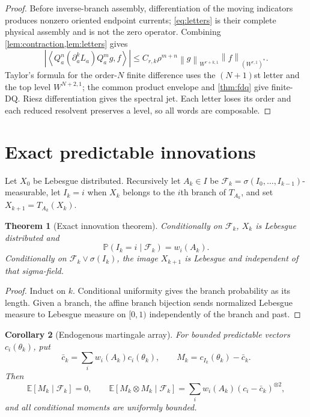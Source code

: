 \documentclass[11pt,reqno]{amsart}
\newtheorem{theorem}{Theorem}[section]
\newtheorem{corollary}[theorem]{Corollary}
\theoremstyle{definition}
\theoremstyle{remark}
\newcommand{\F}{\mathcal F}
\newcommand{\Pp}{\mathbb P}
\newcommand{\norm}[1]{\left\lVert #1\right\rVert}
\newcommand{\abs}[1]{\left\lvert #1\right\rvert}
\newcommand{\pair}[2]{\left\langle #1,#2\right\rangle}
\begin{document}
\begin{proof}
Before inverse-branch assembly, differentiation of the moving indicators
produces nonzero oriented endpoint currents; \eqref{eq:letters} is their
complete physical assembly and is not the zero operator.  Combining
\cref{lem:contraction,lem:letters} gives
\[
 \abs{\pair{Q_a^n(\partial_a^kL_a)Q_a^mg}{f}}
 \le C_{r,k}\rho^{m+n}
 \norm g_{W^{r+k,1}}\norm f_{(W^{r,1})^*}.
\]
Taylor's formula for the order-$N$ finite difference uses the $(N+1)$st
letter and the top level $W^{N+2,1}$; the common product envelope and
\cref{thm:fdq} give finite-DQ.  Riesz differentiation gives the spectral jet.
Each letter loses its order and each reduced resolvent preserves a level, so
all words are composable.
\end{proof}

\section{Exact predictable innovations}\label{sec:innovations}
Let $X_0$ be Lebesgue distributed.  Recursively let $A_k\in I$ be
$\F_k=\sigma(I_0,\ldots,I_{k-1})$-measurable, let $I_k=i$ when
$X_k$ belongs to the $i$th branch of $T_{A_k}$, and set
$X_{k+1}=T_{A_k}(X_k)$.

\begin{theorem}[Exact innovation theorem]\label{thm:innovations}
Conditionally on $\F_k$, $X_k$ is Lebesgue distributed and
\[
 \Pp(I_k=i\mid\F_k)=w_i(A_k).
\]
Conditionally on $\F_k\vee\sigma(I_k)$, the image $X_{k+1}$ is Lebesgue and
independent of that sigma-field.
\end{theorem}

\begin{proof}
Induct on $k$.  Conditional uniformity gives the branch probability as its
length.  Given a branch, the affine branch bijection sends normalized Lebesgue
measure to Lebesgue measure on $[0,1)$ independently of the branch and past.
\end{proof}

\begin{corollary}[Endogenous martingale array]\label{cor:martingale}
For bounded predictable vectors $c_i(\theta_k)$, put
\[
 \bar c_k=\sum_iw_i(A_k)c_i(\theta_k),
 \qquad M_k=c_{I_k}(\theta_k)-\bar c_k.
\]
Then
\[
 \mathbb E[M_k\mid\F_k]=0,
 \qquad
 \mathbb E[M_k\otimes M_k\mid\F_k]
 =\sum_iw_i(A_k)(c_i-\bar c_k)^{\otimes2},
\]
and all conditional moments are uniformly bounded.
\end{corollary}
\end{document}
